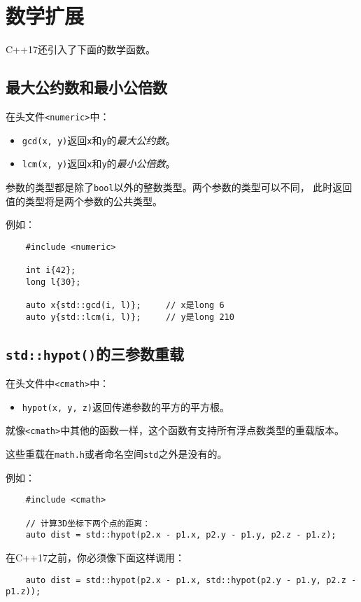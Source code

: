 \section{数学扩展}
C++17还引入了下面的数学函数。

\subsection{最大公约数和最小公倍数}
在头文件\texttt{<numeric>}中：
\begin{itemize}
    \item \texttt{gcd(x, y)}返回\texttt{x}和\texttt{y}的\emph{最大公约数}。
    \item \texttt{lcm(x, y)}返回\texttt{x}和\texttt{y}的\emph{最小公倍数}。
\end{itemize}
参数的类型都是除了\texttt{bool}以外的整数类型。两个参数的类型可以不同，
此时返回值的类型将是两个参数的公共类型。

例如：
\begin{lstlisting}
    #include <numeric>

    int i{42};
    long l{30};

    auto x{std::gcd(i, l)};     // x是long 6
    auto y{std::lcm(i, l)};     // y是long 210
\end{lstlisting}

\subsection{\texttt{std::hypot()}的三参数重载}
在头文件中\texttt{<cmath>}中：
\begin{itemize}
    \item \texttt{hypot(x, y, z)}返回传递参数的平方的平方根。
\end{itemize}
就像\texttt{<cmath>}中其他的函数一样，这个函数有支持所有浮点数类型的重载版本。

这些重载在\texttt{math.h}或者命名空间\texttt{std}之外是没有的。

例如：
\begin{lstlisting}
    #include <cmath>

    // 计算3D坐标下两个点的距离：
    auto dist = std::hypot(p2.x - p1.x, p2.y - p1.y, p2.z - p1.z);
\end{lstlisting}
在C++17之前，你必须像下面这样调用：
\begin{lstlisting}
    auto dist = std::hypot(p2.x - p1.x, std::hypot(p2.y - p1.y, p2.z - p1.z));
\end{lstlisting}

